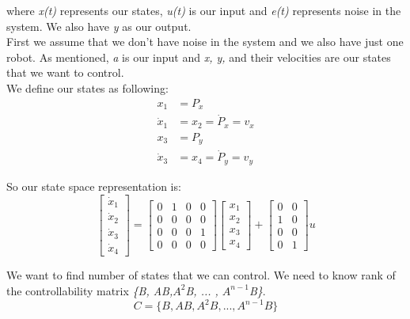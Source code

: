 \documentclass[letterpaper, 10 pt, conference]{ieeeconf}
\begin{document}
where \emph{x(t)} represents our states, \emph{u(t)} is our input and \emph{e(t)} represents noise in the system. We also have \emph{y} as our output.\\
First we assume that we don't have noise in the system and we also have just one robot. As mentioned, \emph{a} is our input and \emph{x, y,} and their velocities are our states that we want to control.\\
We define our states as following:
\begin{align}
x_1 &= P_x \\ \nonumber
\dot{x}_1 &= x_2 = \dot{P}_x = v_x\\\nonumber
x_3 &= P_y\\ \nonumber
 \dot{x}_3 &= x_4 = \dot{P}_y = v_y \nonumber
\end{align}


So our state space representation is:
\begin{equation}
\begin{bmatrix}
\dot{x}_1\\ 
\dot{x}_2\\
\dot{x}_3\\
\dot{x}_4
\end{bmatrix} = \begin{bmatrix}
0 & 1 & 0 & 0 \\
0 & 0 & 0 & 0\\
0 & 0 & 0 & 1\\
0 & 0 & 0 & 0
\end{bmatrix}  \begin{bmatrix}
x_1\\
x_2\\
x_3\\
x_4
\end{bmatrix} + \begin{bmatrix}
0 & 0 \\
1 & 0 \\
0 & 0 \\
0 & 1
\end{bmatrix} u
\end{equation}

We want to find number of states that we can control. We need to know rank of the controllability matrix \emph{\{B, AB,$A^2$B, ... , $A^{n-1}$B\}}.
\begin{equation}
C = \{ B, AB, A^2B, ... , A^{n-1}B \}
\end{equation}
\end{document}
